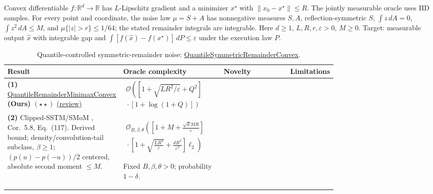 \begin{table}[tp]
\centering
\caption{Quantile-controlled symmetric-remainder noise: \href{https://github.com/k3nfalt/longtails/blob/main/LongTails/Setups/QuantileSymmetricRemainderConvex.lean}{QuantileSymmetricRemainderConvex}.}\label{tab:QuantileSymmetricRemainderConvex}
\parbox{\linewidth}{\footnotesize Convex differentiable $f:\mathbb R^d\to\mathbb R$ has $L$-Lipschitz gradient and a minimizer $x^\star$ with $\|x_0-x^\star\|\le R$. The jointly measurable oracle uses IID samples. For every point and coordinate, the noise law $\mu=S+A$ has nonnegative measures $S,A$, reflection-symmetric $S$, $\int z\,dA=0$, $\int z^2\,dA\le M$, and $\mu\{|z|>r\}\le1/64$; the stated remainder integrals are integrable. Here $d\ge1$, $L,R,r,\varepsilon>0$, $M\ge0$. Target: measurable output $\widehat x$ with integrable gap and $\int[f(\widehat x)-f(x^\star)]\,dP\le\varepsilon$ under the execution law $P$.}\par\smallskip
\begin{threeparttable}
\footnotesize
\setlength{\tabcolsep}{4pt}\renewcommand{\arraystretch}{1.25}
\begin{tabularx}{\linewidth}{@{}>{\raggedright\arraybackslash}p{0.20\linewidth}>{\raggedright\arraybackslash}p{0.32\linewidth}>{\raggedright\arraybackslash}p{0.25\linewidth}>{\raggedright\arraybackslash}X@{}}
\toprule
\textbf{Result} & \textbf{Oracle complexity} & \textbf{Novelty} & \textbf{Limitations} \\
\midrule
\textbf{(1)} \href{https://github.com/k3nfalt/longtails/blob/main/LongTails/Theorems/QuantileRemainderMinimaxConvex.lean}{Quantile\allowbreak Remainder\allowbreak Minimax\allowbreak Convex} \textbf{(Ours)} $(\star\star)$ \href{https://github.com/k3nfalt/longtails/blob/main/scripts/reviews/QuantileRemainderMinimaxConvex.md}{(review)}
& $\begin{gathered}\mathcal{O}\!\left(\left[1+\sqrt{LR^2/\varepsilon}+Q^2\right]\right.\\[-2pt]\left.{}\cdot[1+\log(1+Q)]\right)\end{gathered}$ & & \\
\midrule[1.2pt]
\textbf{(2)} Clipped-SSTM/SMoM \citep{qsrcPuchkin2024v2}, Cor.~5.8, Eq.~(117). Derived bound; density/convolution-tail subclass, $\beta\ge1$; $(p(u)-p(-u))/2$ centered, absolute second moment $\le M$.
& $\begin{gathered}\mathcal{O}_{B,\beta,\theta}\!\left(\left[1+M+\frac{\sqrt d MR}{\varepsilon}\right]\right.\\[-2pt]\left.{}\cdot\left[1+\sqrt{\frac{LR^2}{\varepsilon}}+\frac{dR^2}{\varepsilon^2}\right]\ell_2\right)\end{gathered}$\par Fixed $B,\beta,\theta>0$; probability $1-\delta$.

\end{tabularx}
\end{threeparttable}
\end{table}

